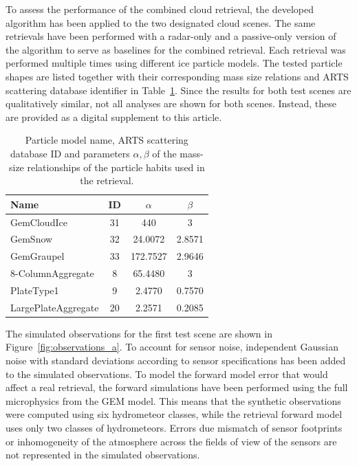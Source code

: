 \documentclass[journal abbreviation, manuscript]{copernicus}
\begin{document}
To assess the performance of the combined cloud retrieval, the developed
algorithm has been applied to the two designated cloud scenes. The same
retrievals have been performed with a radar-only and a passive-only version of
the algorithm to serve as baselines for the combined retrieval. Each retrieval
was performed multiple times using different ice particle models. The tested
particle shapes are listed together with their corresponding mass size relations
and ARTS scattering database identifier in Table~\ref{tab:particles_retrieval}.
Since the results for both test scenes are qualitatively similar, not all
analyses are shown for both scenes. Instead, these are provided as a digital
supplement to this article.

\begin{table}
  \centering
  \caption{Particle model name, ARTS scattering database ID and parameters
    $\alpha, \beta$ of the mass-size relationships of the particle habits used
    in the retrieval.}
  \begin{tabular}{l|c|c|c}
    Name & ID & $\alpha$ & $\beta$ \\
    \hline
    GemCloudIce         & 31  & 440      & 3 \\
    GemSnow             & 32  & 24.0072  & 2.8571 \\
    GemGraupel          & 33  & 172.7527 & 2.9646 \\
    8-ColumnAggregate   &  8  & 65.4480  & 3      \\
    PlateType1          &  9  & 2.4770   & 0.7570 \\
    LargePlateAggregate &  20 & 2.2571   & 0.2085 \\
  \end{tabular}
  \label{tab:particles_retrieval}
\end{table}

The simulated observations for the first test scene are shown in
Figure~\ref{fig:observations_a}. To account for sensor noise, independent
Gaussian noise with standard deviations according to sensor specifications has
been added to the simulated observations. To model the forward model error that
would affect a real retrieval, the forward simulations have been performed using
the full microphysics from the GEM model. This means that the synthetic
observations were computed using six hydrometeor classes, while the retrieval
forward model uses only two classes of hydrometeors. Errors due mismatch of
sensor footprints or inhomogeneity of the atmosphere across the fields of view
of the sensors are not represented in the simulated observations.
\end{document}
